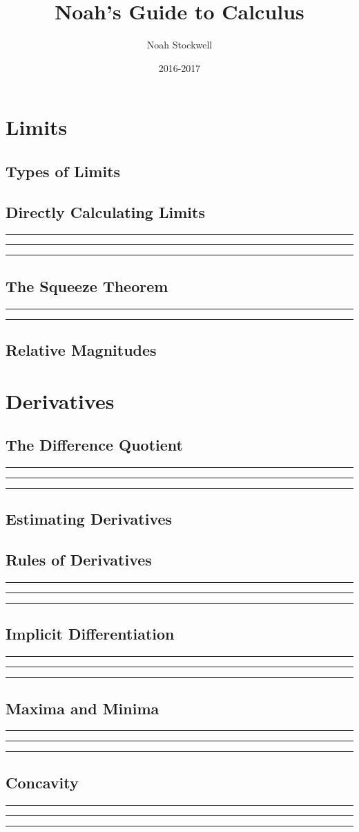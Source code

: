 \documentclass{article}
\title{Noah's Guide to Calculus}
\author{Noah Stockwell}
\date{2016-2017}
\newcommand{\newMidline}{\noindent\rule[0.5ex]{\linewidth}{1pt}}
\newcommand{\newchapter}[2]
{
	\subsection{#1}\newMidline\newMidline\newMidline\vspace{.125in}
}
\begin{document}
\maketitle
\vspace{2in}
\begin{center}\end{center}
\newpage

\newpage

\newpage
\tableofcontents
\newpage
\section{Limits} 
\subsection{Types of Limits}  
\newchapter{Directly Calculating Limits}{DirectlyCalculatingLimits}
\subsection{The Squeeze Theorem}\newMidline\newMidline\vspace{.125in}
\subsection{Relative Magnitudes} \newpage
\section{Derivatives} 
\newpage
\newchapter{The Difference Quotient}{DifferenceQuotient}
\subsection{Estimating Derivatives}
\newchapter{Rules of Derivatives}{DerivativeRules}
\newchapter{Implicit Differentiation}{ImplicitDifferentiation}
\newchapter{Maxima and Minima}{MaxAndMin}
\newchapter{Concavity}{Concavity}
\end{document}
